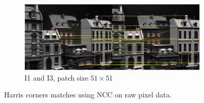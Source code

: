 \documentclass[11pt,a4paper]{article}
\begin{document}
\begin{figure}[h]
\begin{subfigure}[t]{0.9\textwidth}
        \centering
        \includegraphics[width=\textwidth]{images/match_i1_i3_harris_51.pdf}
        \caption{I1 and I3, patch size $51\times51$}
        \label{fig:i1_i3_harris_51}
    \end{subfigure}
    \caption{Harris corners matches using NCC on raw pixel data.}
    \label{fig:matches}
\end{figure}
\end{document}
